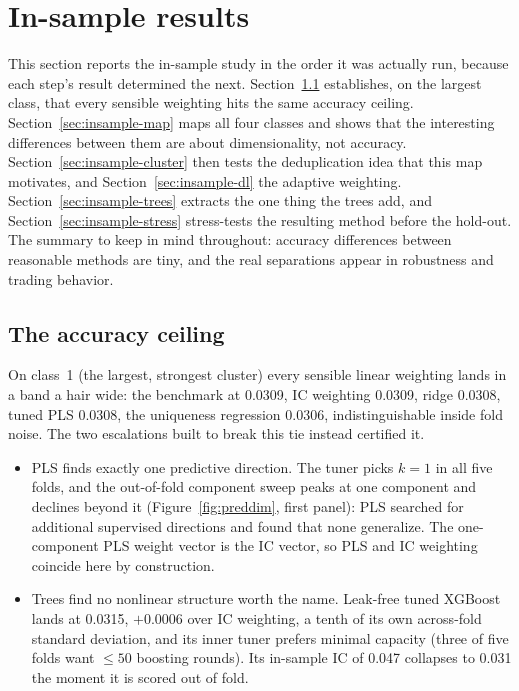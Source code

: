 \documentclass[11pt]{article}
\newcommand{\cone}{class~1}
\begin{document}
\FloatBarrier
\section{In-sample results}
\label{sec:insample}

This section reports the in-sample study in the order it was actually run, because each
step's result determined the next. Section~\ref{sec:insample-ceiling} establishes, on the
largest class, that every sensible weighting hits the same accuracy ceiling.
Section~\ref{sec:insample-map} maps all four classes and shows that the interesting
differences between them are about dimensionality, not accuracy.
Section~\ref{sec:insample-cluster} then tests the deduplication idea that this map
motivates, and Section~\ref{sec:insample-dl} the adaptive weighting.
Section~\ref{sec:insample-trees} extracts the one thing the trees add, and
Section~\ref{sec:insample-stress} stress-tests the resulting method before the hold-out.
The summary to keep in mind throughout: accuracy differences between reasonable methods
are tiny, and the real separations appear in robustness and trading behavior.

\subsection{The accuracy ceiling}
\label{sec:insample-ceiling}

On \cone{} (the largest, strongest cluster) every sensible linear weighting lands in a band
a hair wide: the benchmark at 0.0309, IC weighting 0.0309, ridge 0.0308, tuned PLS 0.0308,
the uniqueness regression 0.0306, indistinguishable inside fold noise. The two escalations
built to break this tie instead certified it.

\begin{itemize}
\item PLS finds exactly one predictive direction. The tuner picks $k=1$ in all five
      folds, and the out-of-fold component sweep peaks at one component and declines
      beyond it (Figure~\ref{fig:preddim}, first panel): PLS searched for additional
      supervised directions and found that none generalize. The one-component PLS weight
      vector is the IC vector, so PLS and IC weighting coincide here by construction.
\item Trees find no nonlinear structure worth the name. Leak-free tuned XGBoost lands
      at 0.0315, $+0.0006$ over IC weighting, a tenth of its own across-fold standard
      deviation, and its inner tuner prefers minimal capacity (three of five folds want
      $\le 50$ boosting rounds). Its in-sample IC of 0.047 collapses to 0.031 the
      moment it is scored out of fold.
\end{itemize}
\end{document}
